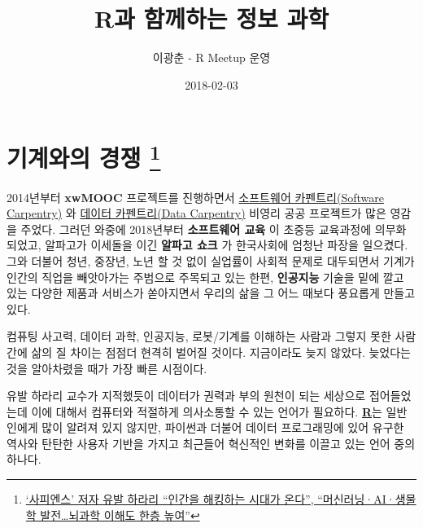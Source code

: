 \documentclass[]{book}
\title{R과 함께하는 정보 과학}
\author{이광춘 - R Meetup 운영}
\date{2018-02-03}
\let\rmarkdownfootnote\footnote%
\def\footnote{\protect\rmarkdownfootnote}
\begin{document}
\maketitle

{
\setcounter{tocdepth}{1}
\tableofcontents
}
\chapter*{\texorpdfstring{기계와의 경쟁 \footnote{\href{http://news.mk.co.kr/newsRead.php?year=2018\&no=58432}{`사피엔스'
  저자 유발 하라리 ``인간을 해킹하는 시대가 온다'', ``머신러닝·AI·생물학
  발전\ldots{}뇌과학 이해도 한층 높여''}}}{기계와의 경쟁 }}\label{--joongang-yuval}

2014년부터 \textbf{xwMOOC} 프로젝트를 진행하면서
\href{https://software-carpentry.org/}{소프트웨어 카펜트리(Software
Carpentry)} 와 \href{https://datacarpentry.org/}{데이터 카펜트리(Data
Carpentry)} 비영리 공공 프로젝트가 많은 영감을 주었다. 그러던 와중에
2018년부터 \textbf{소프트웨어 교육} 이 초중등 교육과정에 의무화되었고,
알파고가 이세돌을 이긴 \textbf{알파고 쇼크} 가 한국사회에 엄청난 파장을
일으켰다. 그와 더불어 청년, 중장년, 노년 할 것 없이 실업률이 사회적
문제로 대두되면서 기계가 인간의 직업을 빼앗아가는 주범으로 주목되고 있는
한편, \textbf{인공지능} 기술을 밑에 깔고 있는 다양한 제품과 서비스가
쏟아지면서 우리의 삶을 그 어느 때보다 풍요롭게 만들고 있다.

컴퓨팅 사고력, 데이터 과학, 인공지능, 로봇/기계를 이해하는 사람과 그렇지
못한 사람간에 삶의 질 차이는 점점더 현격히 벌어질 것이다. 지금이라도
늦지 않았다. 늦었다는 것을 알아차렸을 때가 가장 빠른 시점이다.

유발 하라리 교수가 지적했듯이 데이터가 권력과 부의 원천이 되는 세상으로
접어들었는데 이에 대해서 컴퓨터와 적절하게 의사소통할 수 있는 언어가
필요하다.
\href{http://statkclee.github.io/data-science/ds-r-lang.html}{\textbf{R}}는
일반인에게 많이 알려져 있지 않지만, 파이썬과 더불어 데이터 프로그래밍에
있어 유구한 역사와 탄탄한 사용자 기반을 가지고 최근들어 혁신적인 변화를
이끌고 있는 언어 중의 하나다.
\end{document}
